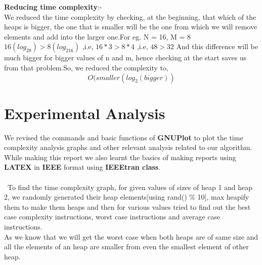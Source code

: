 \documentclass[conference]{IEEEtran}
\begin{document}
\textbf{Reducing time complexity}:-\\
We reduced the time complexity by checking, at the beginning, that which of the heaps is bigger, the one that is smaller will be the one from which we will remove elements and add into the larger one.For eg.
N = 16, M = 8\\
$16(log_28) > 8(log_216)$ ,i.e, $16*3 > 8*4$ ,i.e, $48 > 32$
And this difference will be much bigger for bigger values of n and m, hence checking at the start saves us from that problem.So, we reduced the complexity to,\\
	$$O(smaller(log_2(bigger))$$

\section{\textbf{Experimental Analysis}}
We revised the commands and basic functions of \textbf{GNUPlot} to plot the time complexity analysis graphs and other relevant analysis related to our algorithm.\\
While making this report we also learnt the basics of making reports using \textbf{LATEX} in \textbf{IEEE }format using \textbf{IEEEtran class}.\\\\
\     To find the time complexity graph, for given values of sizes of heap 1 and heap 2, we randomly generated their heap elements[using rand() \% 10], max heapify them to make them heaps and then for various values tried to find out the best case complexity instructions, worst case instructions and average case instructions.\\

As we know that we will get the worst case when both heaps are of same size and all the elements of an heap are smaller from even the smallest element of other heap.\\
\end{document}

